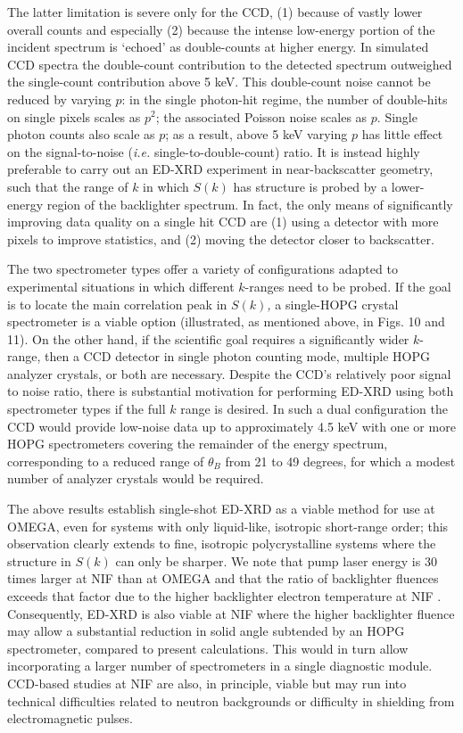 The latter limitation is severe only for the CCD, (1) because of vastly
lower overall counts and especially (2) because the intense low-energy
portion of the incident spectrum is `echoed' as double-counts at higher
energy. In simulated CCD spectra the double-count contribution to the
detected spectrum outweighed the single-count contribution above 5 keV.
This double-count noise cannot be reduced by varying \(p\): in the
single photon-hit regime, the number of double-hits on single pixels
scales as \(p^{2}\); the associated Poisson noise scales as \(p\).
Single photon counts also scale as \(p\); as a result, above 5 keV
varying \(p\) has little effect on the signal-to-noise (\emph{i.e.}
single-to-double-count) ratio. It is instead highly preferable to carry
out an ED-XRD experiment in near-backscatter geometry, such that the
range of \(k\) in which \(S(k)\) has structure is probed by a
lower-energy region of the backlighter spectrum. In fact, the only means
of significantly improving data quality on a single hit CCD are (1)
using a detector with more pixels to improve statistics, and (2) moving
the detector closer to backscatter.

The two spectrometer types offer a variety of configurations adapted to
experimental situations in which different \(k\)-ranges need to be
probed. If the goal is to locate the main correlation peak in
\(S(k)\)\emph{,} a single-HOPG crystal spectrometer is a viable option
(illustrated, as mentioned above, in Figs. 10 and 11). On the other
hand, if the scientific goal requires a significantly wider \(k\)-range,
then a CCD detector in single photon counting mode, multiple HOPG
analyzer crystals, or both are necessary. Despite the CCD's relatively
poor signal to noise ratio, there is substantial motivation for
performing ED-XRD using both spectrometer types if the full \(k\) range
is desired. In such a dual configuration the CCD would provide low-noise
data up to approximately 4.5 keV with one or more HOPG spectrometers
covering the remainder of the energy spectrum, corresponding to a
reduced range of \(\theta_{B}\) from 21 to 49 degrees, for which a
modest number of analyzer crystals would be required.

The above results establish single-shot ED-XRD as a viable method for
use at OMEGA, even for systems with only liquid-like, isotropic
short-range order; this observation clearly extends to fine, isotropic
polycrystalline systems where the structure in \(S(k)\) can only be
sharper. We note that pump laser energy is 30 times larger at NIF than
at OMEGA and that the ratio of backlighter fluences exceeds that factor
due to the higher backlighter electron temperature at NIF
\hyperref[b.-r.-maddox-et-al.-physics-of-plasmas-18-056709-2011.]\cite{MADDOX2011ABSOLUTE}.
Consequently, ED-XRD is also viable at NIF where the higher backlighter
fluence may allow a substantial reduction in solid angle subtended by an
HOPG spectrometer, compared to present calculations. This would in turn
allow incorporating a larger number of spectrometers in a single
diagnostic module. CCD-based studies at NIF are also, in principle,
viable but may run into technical difficulties related to neutron
backgrounds or difficulty in shielding from electromagnetic pulses.

